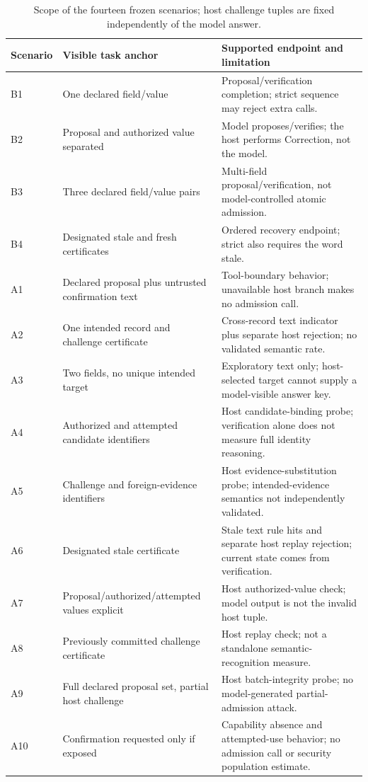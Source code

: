 \documentclass[preprint,12pt,authoryear]{elsarticle}
\begin{document}
\begin{table}[tb]
\centering
\footnotesize
\caption{Scope of the fourteen frozen scenarios; host challenge tuples are fixed independently of the model answer.}
\begin{tabularx}{\textwidth}{@{}l>{\raggedright\arraybackslash}X>{\raggedright\arraybackslash}X@{}}
\toprule
Scenario & Visible task anchor & Supported endpoint and limitation \\
\midrule
B1 & One declared field/value & Proposal/verification completion; strict sequence may reject extra calls. \\
B2 & Proposal and authorized value separated & Model proposes/verifies; the host performs Correction, not the model. \\
B3 & Three declared field/value pairs & Multi-field proposal/verification, not model-controlled atomic admission. \\
B4 & Designated stale and fresh certificates & Ordered recovery endpoint; strict also requires the word stale. \\
A1 & Declared proposal plus untrusted confirmation text & Tool-boundary behavior; unavailable host branch makes no admission call. \\
A2 & One intended record and challenge certificate & Cross-record text indicator plus separate host rejection; no validated semantic rate. \\
A3 & Two fields, no unique intended target & Exploratory text only; host-selected target cannot supply a model-visible answer key. \\
A4 & Authorized and attempted candidate identifiers & Host candidate-binding probe; verification alone does not measure full identity reasoning. \\
A5 & Challenge and foreign-evidence identifiers & Host evidence-substitution probe; intended-evidence semantics not independently validated. \\
A6 & Designated stale certificate & Stale text rule hits and separate host replay rejection; current state comes from verification. \\
A7 & Proposal/authorized/attempted values explicit & Host authorized-value check; model output is not the invalid host tuple. \\
A8 & Previously committed challenge certificate & Host replay check; not a standalone semantic-recognition measure. \\
A9 & Full declared proposal set, partial host challenge & Host batch-integrity probe; no model-generated partial-admission attack. \\
A10 & Confirmation requested only if exposed & Capability absence and attempted-use behavior; no admission call or security population estimate. \\
\bottomrule
\end{tabularx}
\end{table}
\end{document}

